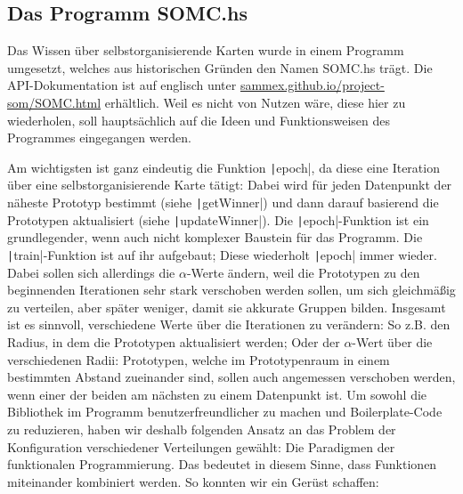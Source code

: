 \documentclass[twoside,a4paper]{article}
\newcommand{\haskell}[1]{\texttt|#1|}
\begin{document}
\subsection{Das Programm \glqq{}SOMC.hs\grqq{}}

Das Wissen über selbstorganisierende Karten wurde in einem Programm umgesetzt, welches aus historischen Gründen den Namen SOMC.hs trägt. Die API-Dokumentation ist auf englisch unter \url{sammex.github.io/project-som/SOMC.html} erhältlich. Weil es nicht von Nutzen wäre, diese hier zu wiederholen, soll hauptsächlich auf die Ideen und Funktionsweisen des Programmes eingegangen werden.

Am wichtigsten ist ganz eindeutig die Funktion \haskell{epoch}, da diese eine Iteration über eine selbstorganisierende Karte tätigt: Dabei wird für jeden Datenpunkt der näheste Prototyp bestimmt (siehe \haskell{getWinner}) und dann darauf basierend die Prototypen aktualisiert (siehe \haskell{updateWinner}). Die \haskell{epoch}-Funktion ist ein grundlegender, wenn auch nicht komplexer Baustein für das Programm. Die \haskell{train}-Funktion ist auf ihr aufgebaut; Diese wiederholt \haskell{epoch} immer wieder. Dabei sollen sich allerdings die \(\alpha\)-Werte ändern, weil die Prototypen zu den beginnenden Iterationen sehr stark verschoben werden sollen, um sich gleichmäßig zu verteilen, aber später weniger, damit sie akkurate Gruppen bilden. Insgesamt ist es sinnvoll, verschiedene Werte über die Iterationen zu verändern: So z.B. den Radius, in dem die Prototypen aktualisiert werden; Oder der \(\alpha\)-Wert über die verschiedenen Radii: Prototypen, welche im Prototypenraum in einem bestimmten Abstand zueinander sind, sollen auch angemessen verschoben werden, wenn einer der beiden am nächsten zu einem Datenpunkt ist. Um sowohl die Bibliothek im Programm benutzerfreundlicher zu machen und Boilerplate-Code zu reduzieren, haben wir deshalb folgenden Ansatz an das Problem der Konfiguration verschiedener Verteilungen gewählt: Die Paradigmen der funktionalen Programmierung. Das bedeutet in diesem Sinne, dass Funktionen miteinander kombiniert werden. So konnten wir ein Gerüst schaffen:
\end{document}
